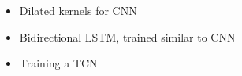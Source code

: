\begin{itemize}
\item Dilated kernels for CNN
\item Bidirectional LSTM, trained similar to CNN
\item Training a TCN \cite{intro}
\end{itemize}
